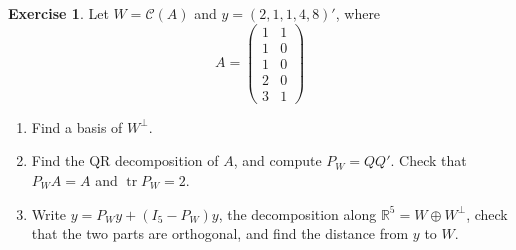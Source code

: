 \documentclass[12pt]{article}
\newcommand{\R}{\mathbb R}
\DeclareMathOperator{\tr}{tr}
\theoremstyle{definition}
\newtheorem{exercise}{Exercise}
\begin{document}
\begin{exercise}\label{r6-ex-projection-drill}
Let \(W=\mathcal C(A)\) and \(y=(2,1,1,4,8)'\), where
\[
A=\begin{pmatrix}1&1\\1&0\\1&0\\2&0\\3&1\end{pmatrix}
\]
\begin{enumerate}
\item Find a basis of \(W^\perp\).
\item Find the QR decomposition of \(A\), and compute \(P_W=QQ'\). Check that \(P_WA=A\) and \(\tr P_W=2\).
\item Write \(y=P_Wy+(I_5-P_W)y\), the decomposition along \(\R^5=W\oplus W^\perp\), check that the two parts are
orthogonal, and find the distance from \(y\) to \(W\).
\end{enumerate}
\end{exercise}
\end{document}

